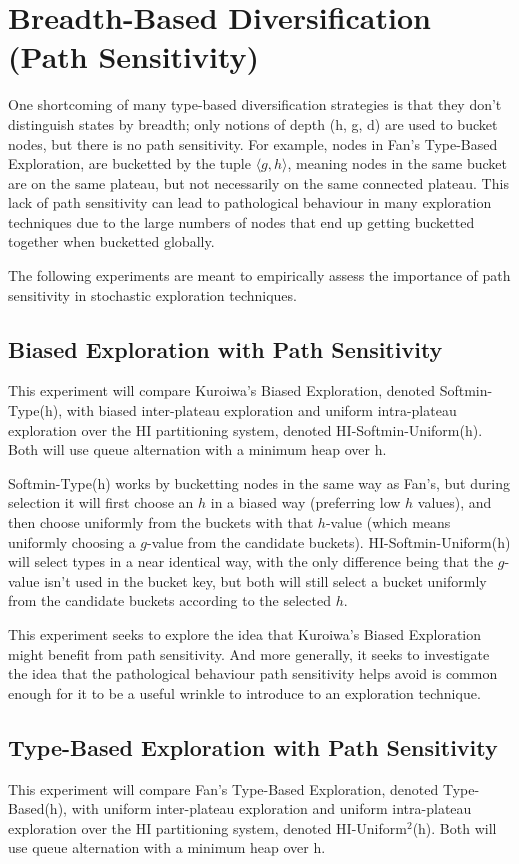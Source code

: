 \documentclass{article}
\theoremstyle{definition}
\begin{document}
\section{Breadth-Based Diversification (Path Sensitivity)}
One shortcoming of many type-based diversification strategies is that they don't distinguish states by breadth; only notions of depth (h, g, d) are used to bucket nodes, but there is no path sensitivity. For example, nodes in Fan's Type-Based Exploration, are bucketted by the tuple $\langle g, h \rangle$, meaning nodes in the same bucket are on the same plateau, but not necessarily on the same connected plateau. This lack of path sensitivity can lead to pathological behaviour in many exploration techniques due to the large numbers of nodes that end up getting bucketted together when bucketted globally. 

The following experiments are meant to empirically assess the importance of path sensitivity in stochastic exploration techniques.

\subsection{Biased Exploration with Path Sensitivity}
This experiment will compare Kuroiwa's Biased Exploration, denoted Softmin-Type(h), with biased inter-plateau exploration and uniform intra-plateau exploration over the HI partitioning system, denoted HI-Softmin-Uniform(h). Both will use queue alternation with a minimum heap over h.  

Softmin-Type(h) works by bucketting nodes in the same way as Fan's, but during selection it will first choose an $h$ in a biased way (preferring low $h$ values), and then choose uniformly from the buckets with that $h$-value (which means uniformly choosing a $g$-value from the candidate buckets). HI-Softmin-Uniform(h) will select types in a near identical way, with the only difference being that the $g$-value isn't used in the bucket key, but both will still select a bucket uniformly from the candidate buckets according to the selected $h$.

This experiment seeks to explore the idea that Kuroiwa's Biased Exploration might benefit from path sensitivity. And more generally, it seeks to investigate the idea that the pathological behaviour path sensitivity helps avoid is common enough for it to be a useful wrinkle to introduce to an exploration technique.  

\subsection{Type-Based Exploration with Path Sensitivity}
This experiment will compare Fan's Type-Based Exploration, denoted Type-Based(h), with uniform inter-plateau exploration and uniform intra-plateau exploration over the HI partitioning system, denoted HI-Uniform$^2$(h). Both will use queue alternation with a minimum heap over h.  
\end{document}
